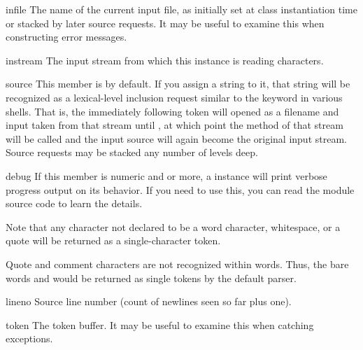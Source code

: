 \begin{memberdesc}{infile}
The name of the current input file, as initially set at class
instantiation time or stacked by later source requests.  It may
be useful to examine this when constructing error messages.
\end{memberdesc}

\begin{memberdesc}{instream}
The input stream from which this  instance is reading
characters.
\end{memberdesc}

\begin{memberdesc}{source}
This member is  by default.  If you assign a string to it,
that string will be recognized as a lexical-level inclusion request
similar to the  keyword in various shells.  That is, the
immediately following token will opened as a filename and input taken
from that stream until \EOF, at which point the 
method of that stream will be called and the input source will again
become the original input stream. Source requests may be stacked any
number of levels deep.
\end{memberdesc}

\begin{memberdesc}{debug}
If this member is numeric and  or more, a 
instance will print verbose progress output on its behavior.  If you
need to use this, you can read the module source code to learn the
details.
\end{memberdesc}

Note that any character not declared to be a word character,
whitespace, or a quote will be returned as a single-character token.

Quote and comment characters are not recognized within words.  Thus,
the bare words  and  would be returned as single
tokens by the default parser.

\begin{memberdesc}{lineno}
Source line number (count of newlines seen so far plus one).
\end{memberdesc}

\begin{memberdesc}{token}
The token buffer.  It may be useful to examine this when catching
exceptions.
\end{memberdesc}
